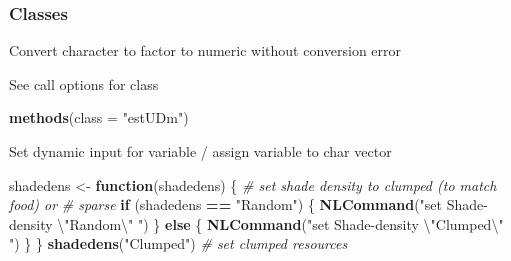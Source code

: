 \documentclass[10,portrait]{article}
\newenvironment{Shaded}{\begin{snugshade}}{\end{snugshade}}
\newcommand{\KeywordTok}[1]{\textcolor[rgb]{0.13,0.29,0.53}{\textbf{#1}}}
\newcommand{\DataTypeTok}[1]{\textcolor[rgb]{0.13,0.29,0.53}{#1}}
\newcommand{\CharTok}[1]{\textcolor[rgb]{0.31,0.60,0.02}{#1}}
\newcommand{\StringTok}[1]{\textcolor[rgb]{0.31,0.60,0.02}{#1}}
\newcommand{\CommentTok}[1]{\textcolor[rgb]{0.56,0.35,0.01}{\textit{#1}}}
\newcommand{\OtherTok}[1]{\textcolor[rgb]{0.56,0.35,0.01}{#1}}
\newcommand{\ControlFlowTok}[1]{\textcolor[rgb]{0.13,0.29,0.53}{\textbf{#1}}}
\newcommand{\OperatorTok}[1]{\textcolor[rgb]{0.81,0.36,0.00}{\textbf{#1}}}
\newcommand{\NormalTok}[1]{#1}
\begin{document}
\subsubsection{Classes}\label{classes}

Convert character to factor to numeric without conversion error

\begin{Shaded}
\end{Shaded}

See call options for class

\begin{Shaded}
\begin{Highlighting}[]
\KeywordTok{methods}\NormalTok{(}\DataTypeTok{class =} \StringTok{"estUDm"}\NormalTok{)}
\end{Highlighting}
\end{Shaded}

Set dynamic input for variable / assign variable to char vector

\begin{Shaded}
\begin{Highlighting}[]
\NormalTok{shadedens <-}\StringTok{ }\ControlFlowTok{function}\NormalTok{(shadedens) \{}
    \CommentTok{# set shade density to clumped (to match food) or}
    \CommentTok{# sparse}
    \ControlFlowTok{if}\NormalTok{ (shadedens }\OperatorTok{==}\StringTok{ "Random"}\NormalTok{) \{}
        \KeywordTok{NLCommand}\NormalTok{(}\StringTok{"set Shade-density }\CharTok{\textbackslash{}"}\StringTok{Random}\CharTok{\textbackslash{}"}\StringTok{ "}\NormalTok{)}
\NormalTok{    \} }\ControlFlowTok{else}\NormalTok{ \{}
        \KeywordTok{NLCommand}\NormalTok{(}\StringTok{"set Shade-density }\CharTok{\textbackslash{}"}\StringTok{Clumped}\CharTok{\textbackslash{}"}\StringTok{ "}\NormalTok{)}
\NormalTok{    \}}
\NormalTok{\}}
\KeywordTok{shadedens}\NormalTok{(}\StringTok{"Clumped"}\NormalTok{)  }\CommentTok{# set clumped resources}
\end{Highlighting}
\end{Shaded}
\end{document}
